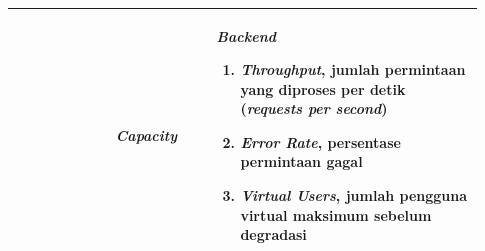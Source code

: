 \begin{longtable}{|p{0.2\linewidth}|p{0.2\linewidth}|p{0.53\linewidth}|}
                                                                  & \textbf{\textit{Capacity}}                                                                                                                              & \textbf{\textit{Backend}} \begin{enumerate}[before=\vspace{8pt}, leftmargin=*, nosep, series=PC] \item \textit{Throughput}, jumlah permintaan yang diproses per detik (\textit{requests per second}) \item \textit{Error Rate}, persentase permintaan gagal \item \textit{Virtual Users}, jumlah pengguna virtual maksimum sebelum degradasi \end{enumerate}                                                                                                                                                                                                                                                                                                                                                                                                                                                                                                                                                                                                                                                                                                                                                                                                                                                                                                                                                                                                                                                                \\
      \hline


\end{longtable}
